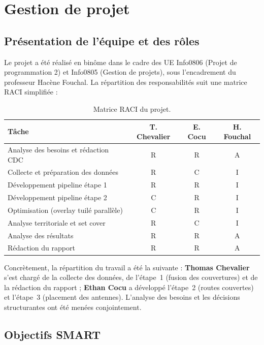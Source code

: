 \documentclass[11pt,a4paper]{article}
\begin{document}
\section{Gestion de projet}

\subsection{Présentation de l'équipe et des rôles}

Le projet a été réalisé en binôme dans le cadre des UE Info0806 (Projet de programmation 2) et Info0805 (Gestion de projets), sous l'encadrement du professeur Hacène Fouchal. La répartition des responsabilités suit une matrice RACI simplifiée :

\begin{table}[H]
  \centering
  \caption{Matrice RACI du projet.}
  \begin{tabular}{lccc}
    \toprule
    \textbf{Tâche} & \textbf{T. Chevalier} & \textbf{E. Cocu} & \textbf{H. Fouchal} \\
    \midrule
    Analyse des besoins et rédaction CDC  & R & R & A \\
    Collecte et préparation des données   & R & C & I \\
    Développement pipeline étape 1        & R & R & I \\
    Développement pipeline étape 2        & C & R & I \\
    Optimisation (overlay tuilé parallèle) & C & R & I \\
    Analyse territoriale et set cover     & R & C & I \\
    Analyse des résultats                 & R & R & A \\
    Rédaction du rapport                  & R & R & A \\
    \bottomrule
  \end{tabular}
\end{table}

Concrètement, la répartition du travail a été la suivante : \textbf{Thomas Chevalier} s'est chargé de la collecte des données, de l'étape~1 (fusion des couvertures) et de la rédaction du rapport ; \textbf{Ethan Cocu} a développé l'étape~2 (routes couvertes) et l'étape~3 (placement des antennes). L'analyse des besoins et les décisions structurantes ont été menées conjointement.

\subsection{Objectifs SMART}
\end{document}
